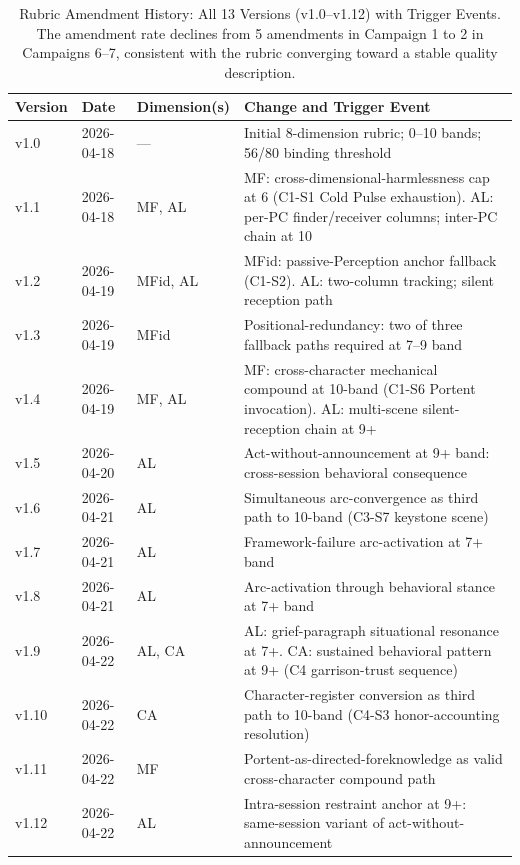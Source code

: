 \begin{table}[t]
\caption{Rubric Amendment History: All 13 Versions (v1.0--v1.12) with Trigger Events.
  The amendment rate declines from 5 amendments in Campaign 1 to 2 in Campaigns 6--7,
  consistent with the rubric converging toward a stable quality description.}
\label{tab:amendments}
\begin{tabular}{@{}lllp{7cm}@{}}
\toprule
Version & Date & Dimension(s) & Change and Trigger Event \\
\midrule
v1.0 & 2026-04-18 & --- & Initial 8-dimension rubric; 0--10 bands; 56/80 binding threshold \\
v1.1 & 2026-04-18 & MF, AL & MF: cross-dimensional-harmlessness cap at 6 (C1-S1 Cold Pulse exhaustion). AL: per-PC finder/receiver columns; inter-PC chain at 10 \\
v1.2 & 2026-04-19 & MFid, AL & MFid: passive-Perception anchor fallback (C1-S2). AL: two-column tracking; silent reception path \\
v1.3 & 2026-04-19 & MFid & Positional-redundancy: two of three fallback paths required at 7--9 band \\
v1.4 & 2026-04-19 & MF, AL & MF: cross-character mechanical compound at 10-band (C1-S6 Portent invocation). AL: multi-scene silent-reception chain at 9+ \\
v1.5 & 2026-04-20 & AL & Act-without-announcement at 9+ band: cross-session behavioral consequence \\
v1.6 & 2026-04-21 & AL & Simultaneous arc-convergence as third path to 10-band (C3-S7 keystone scene) \\
v1.7 & 2026-04-21 & AL & Framework-failure arc-activation at 7+ band \\
v1.8 & 2026-04-21 & AL & Arc-activation through behavioral stance at 7+ band \\
v1.9 & 2026-04-22 & AL, CA & AL: grief-paragraph situational resonance at 7+. CA: sustained behavioral pattern at 9+ (C4 garrison-trust sequence) \\
v1.10 & 2026-04-22 & CA & Character-register conversion as third path to 10-band (C4-S3 honor-accounting resolution) \\
v1.11 & 2026-04-22 & MF & Portent-as-directed-foreknowledge as valid cross-character compound path \\
v1.12 & 2026-04-22 & AL & Intra-session restraint anchor at 9+: same-session variant of act-without-announcement \\
\bottomrule
\end{tabular}
\end{table}

